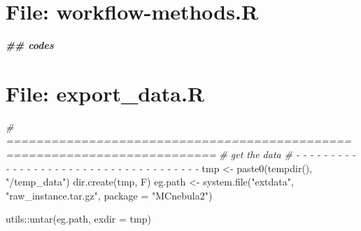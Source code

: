 \documentclass[
]{article}
\newenvironment{Shaded}{\begin{snugshade}}{\end{snugshade}}
\newcommand{\AttributeTok}[1]{\textcolor[rgb]{0.77,0.63,0.00}{#1}}
\newcommand{\CommentTok}[1]{\textcolor[rgb]{0.56,0.35,0.01}{\textit{#1}}}
\newcommand{\DocumentationTok}[1]{\textcolor[rgb]{0.56,0.35,0.01}{\textbf{\textit{#1}}}}
\newcommand{\FunctionTok}[1]{\textcolor[rgb]{0.00,0.00,0.00}{#1}}
\newcommand{\NormalTok}[1]{#1}
\newcommand{\OtherTok}[1]{\textcolor[rgb]{0.56,0.35,0.01}{#1}}
\newcommand{\SpecialCharTok}[1]{\textcolor[rgb]{0.00,0.00,0.00}{#1}}
\newcommand{\StringTok}[1]{\textcolor[rgb]{0.31,0.60,0.02}{#1}}
\begin{document}
\hypertarget{file-workflow-methods.r}{%
\section{File: workflow-methods.R}\label{file-workflow-methods.r}}

\begin{Shaded}
\begin{Highlighting}[]
\DocumentationTok{\#\# codes}
\end{Highlighting}
\end{Shaded}

\hypertarget{file-export_data.r}{%
\section{File: export\_data.R}\label{file-export_data.r}}

\begin{Shaded}
\begin{Highlighting}[]
\CommentTok{\# ==========================================================================}
\CommentTok{\# get the data}
\CommentTok{\# {-} {-} {-} {-} {-} {-} {-} {-} {-} {-} {-} {-} {-} {-} {-} {-} {-} {-} {-} {-} {-} {-} {-} {-} {-} {-} {-} {-} {-} {-} {-} {-} {-} {-} {-} {-} {-}}
\NormalTok{tmp }\OtherTok{\textless{}{-}} \FunctionTok{paste0}\NormalTok{(}\FunctionTok{tempdir}\NormalTok{(), }\StringTok{"/temp\_data"}\NormalTok{)}
\FunctionTok{dir.create}\NormalTok{(tmp, F)}
\NormalTok{eg.path }\OtherTok{\textless{}{-}} \FunctionTok{system.file}\NormalTok{(}\StringTok{"extdata"}\NormalTok{, }\StringTok{"raw\_instance.tar.gz"}\NormalTok{,}
                       \AttributeTok{package =} \StringTok{"MCnebula2"}\NormalTok{)}

\NormalTok{utils}\SpecialCharTok{::}\FunctionTok{untar}\NormalTok{(eg.path, }\AttributeTok{exdir =}\NormalTok{ tmp)}
\end{Highlighting}
\end{Shaded}
\end{document}

